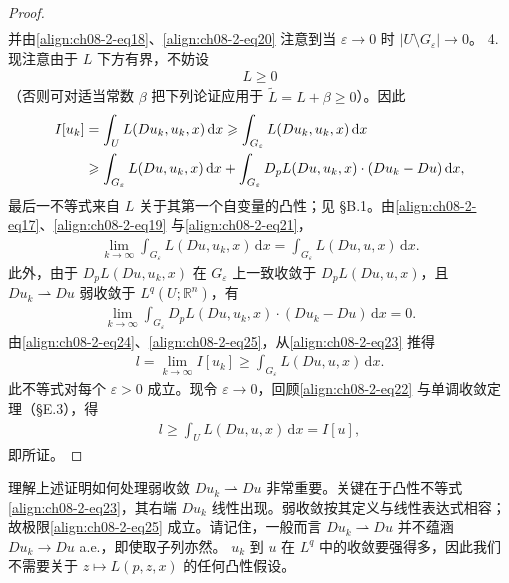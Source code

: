 \documentclass[../../main.tex]{subfiles}
\begin{document}
\begin{theorem}[弱下半连续性]
\begin{proof}
\begin{align}
\end{align}
并由\eqref{align:ch08-2-eq18}、\eqref{align:ch08-2-eq20} 注意到当 $\varepsilon\to 0$ 时 $|U\setminus G_\varepsilon|\to 0$。
4. 现注意由于 $L$ 下方有界，不妨设
\begin{align}
L\geqslant 0\label{align:ch08-2-eq22}
\end{align}
（否则可对适当常数 $\beta$ 把下列论证应用于 $\widetilde{L}=L+\beta\geqslant 0$）。因此
\begin{align}
I[u_k]&=\int_U L(Du_k,u_k,x)\,\mathrm{d}x\geqslant\int_{G_\varepsilon}L(Du_k,u_k,x)\,\mathrm{d}x\notag\\
&\geqslant\int_{G_\varepsilon}L(Du,u_k,x)\,\mathrm{d}x+\int_{G_\varepsilon}D_pL(Du,u_k,x)\cdot(Du_k-Du)\,\mathrm{d}x,\label{align:ch08-2-eq23}
\end{align}
最后一不等式来自 $L$ 关于其第一个自变量的凸性；见 \S B.1。由\eqref{align:ch08-2-eq17}、\eqref{align:ch08-2-eq19} 与\eqref{align:ch08-2-eq21}，
\begin{align}
\lim_{k\to\infty}\int_{G_\varepsilon}L(Du,u_k,x)\,\mathrm{d}x=\int_{G_\varepsilon}L(Du,u,x)\,\mathrm{d}x.\label{align:ch08-2-eq24}
\end{align}
此外，由于 $D_pL(Du,u_k,x)$ 在 $G_\varepsilon$ 上一致收敛于 $D_pL(Du,u,x)$，且 $Du_k\rightharpoonup Du$ 弱收敛于 $L^q(U;\mathbb{R}^n)$，有
\begin{align}
\lim_{k\to\infty}\int_{G_\varepsilon}D_pL(Du,u_k,x)\cdot(Du_k-Du)\,\mathrm{d}x=0.\label{align:ch08-2-eq25}
\end{align}
由\eqref{align:ch08-2-eq24}、\eqref{align:ch08-2-eq25}，从\eqref{align:ch08-2-eq23} 推得
\begin{align*}
l=\lim_{k\to\infty}I[u_k]\geqslant\int_{G_\varepsilon}L(Du,u,x)\,\mathrm{d}x.
\end{align*}
此不等式对每个 $\varepsilon>0$ 成立。现令 $\varepsilon\to 0$，回顾\eqref{align:ch08-2-eq22} 与单调收敛定理（\S E.3），得
\begin{align*}
l\geqslant\int_U L(Du,u,x)\,\mathrm{d}x=I[u],
\end{align*}
即所证。
\end{proof}
\end{theorem}

\begin{remark}\label{remark:ch08-2-1-弱收敛处理}
理解上述证明如何处理弱收敛 $Du_k\rightharpoonup Du$ 非常重要。关键在于凸性不等式\eqref{align:ch08-2-eq23}，其右端 $Du_k$ 线性出现。弱收敛按其定义与线性表达式相容；故极限\eqref{align:ch08-2-eq25} 成立。请记住，一般而言 $Du_k\rightharpoonup Du$ 并不蕴涵 $Du_k\to Du$ a.e.，即使取子列亦然。
$u_k$ 到 $u$ 在 $L^q$ 中的收敛要强得多，因此我们不需要关于 $z\mapsto L(p,z,x)$ 的任何凸性假设。
\end{remark}
\end{document}
